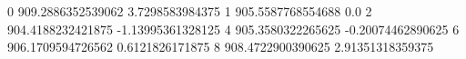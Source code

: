 0 909.2886352539062 3.7298583984375
1 905.5587768554688 0.0
2 904.4188232421875 -1.13995361328125
4 905.3580322265625 -0.20074462890625
6 906.1709594726562 0.6121826171875
8 908.4722900390625 2.91351318359375
